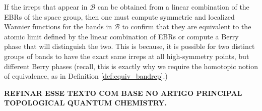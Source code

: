 If the irreps that appear in $\mathcal{B}$ can be obtained from a linear combination of the EBRs of the space group, then one must compute symmetric and localized Wannier functions for the bands in $\mathcal{B}$ to confirm that they are equivalent to the atomic limit defined by the linear combination of EBRs or compute a Berry phase that will distinguish the two. This is because, it is possible for two distinct groups of bands to have the exact same irreps at all high-symmetry points, but different Berry phases (recall, this is exactly why we require the homotopic notion of equivalence, as in Definition \ref{def:equiv_bandrep}.)


\n\n

\textbf{REFINAR ESSE TEXTO COM BASE NO ARTIGO PRINCIPAL TOPOLOGICAL QUANTUM CHEMISTRY.}



%



